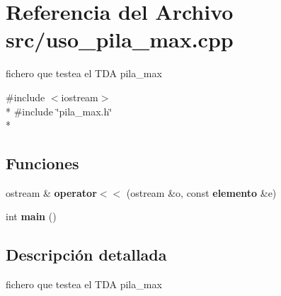 \section{Referencia del Archivo src/uso\+\_\+pila\+\_\+max.cpp}
\label{uso__pila__max_8cpp}


fichero que testea el T\+DA pila\+\_\+max  


{\ttfamily \#include $<$iostream$>$}\\*
{\ttfamily \#include \char`\"{}pila\+\_\+max.\+h\char`\"{}}\\*
\subsection*{Funciones}
\begin{DoxyCompactItemize}
\item 
ostream \& {\bfseries operator$<$$<$} (ostream \&o, const {\bf elemento} \&e)\label{uso__pila__max_8cpp_ab777891f7cce55c9b1b8af238079b62f}

\item 
int {\bfseries main} ()\label{uso__pila__max_8cpp_ae66f6b31b5ad750f1fe042a706a4e3d4}

\end{DoxyCompactItemize}


\subsection{Descripción detallada}
fichero que testea el T\+DA pila\+\_\+max 

